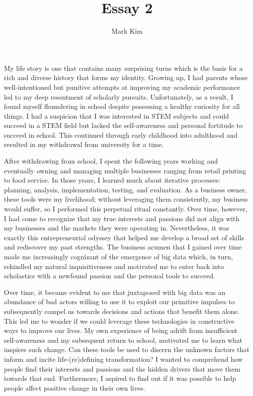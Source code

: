 \documentclass[12pt]{article}
\title{Essay 2}
\author{Mark Kim}
\begin{document}
\maketitle

My life story is one that contains many surprising turns which is the basis for
a rich and diverse history that forms my identity.  Growing up, I had parents
whose well-intentioned but punitive attempts at improving my academic
performance led to my deep resentment of scholarly pursuits.  Unfortunately, as
a result, I found myself floundering in school despite possessing a healthy
curiosity for all things.  I had a suspicion that I was interested in STEM
subjects and could succeed in a STEM field but lacked the self-awareness and
personal fortitude to succeed in school.  This continued through early childhood
into adulthood and resulted in my withdrawal from university for a time.

After withdrawing from school, I spent the following years working and
eventually owning and managing multiple businesses ranging from retail printing
to food service.  In those years, I learned much about iterative processes:
planning, analysis, implementation, testing, and evaluation.  As a business
owner, these tools were my livelihood; without leveraging them
consistently, my business would suffer, so I performed this perpetual ritual constantly.
Over time, however, I had come to recognize that my true interests and
passions did not align with my businesses and the markets they were operating
in. Nevertheless, it was exactly this entrepreneurial odyssey that helped me
develop a broad set of skills and rediscover my past strengths.  The business
acumen that I gained over time made me increasingly cognizant of the emergence
of big data which, in turn, rekindled my natural inquisitiveness and motivated
me to enter back into scholastics with a newfound passion and the personal tools
to succeed.

Over time, it became evident to me that juxtaposed with big data was an
abundance of bad actors willing to use it to exploit our primitive impulses to
subsequently compel us towards decisions and actions that benefit them alone.
This led me to wonder if we could leverage these technologies in constructive
ways to improve our lives. My own experience of being adrift from insufficient
self-awareness and my subsequent return to school, motivated me to learn what
inspires such change. Can these tools be used to discern the unknown factors
that inform and incite life-(re)defining transformation?  I wanted to comprehend
how people find their interests and passions and the hidden drivers that move
them towards that end.  Furthermore, I aspired to find out if it was possible to
help people affect positive change in their own lives.
\end{document}
